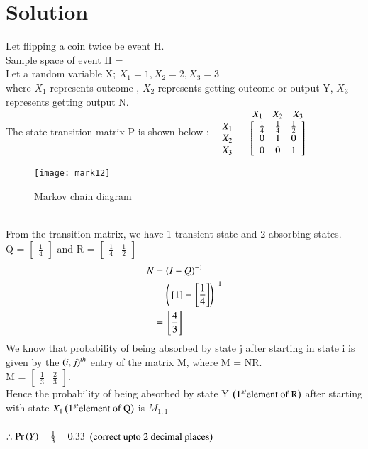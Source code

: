 \documentclass[journal,12pt,twocolumn]{IEEEtran}
\begin{document}
\section*{Solution}
Let flipping a coin twice be event H.\\
Sample space of event H = \\
Let a random variable X; $X_{1}=1, X_{2}=2, X_{3}=3$ \\
where $X_{1}$ represents outcome , $X_{2}$ represents getting outcome  or output Y, $X_{3}$ represents getting output N.\\
The state transition matrix P is shown below :
$\begin{array}{c c} &
\begin{array}{c c c} X_{1}  & X_{2} & X_{3} \\
\end{array}
\\
\begin{array}{c c c}
X_{1} \\
X_{2}\\
X_{3}
\end{array}
&
\left[
\begin{array}{c c c}
\frac{1}{4} & \frac{1}{4} & \frac{1}{2} \\
0 & 1 & 0 \\
0 & 0 & 1 
\end{array}
\right]
\end{array}$
\\
\begin{figure}[h]
\caption*{Markov chain diagram}
\centering
\texttt{[image: mark12]}\\
\end{figure}\\
From the transition matrix, we have 1 transient state and 2 absorbing states.\\ Q = $\begin{bmatrix} \frac{1}{4} \end{bmatrix}$ and R = $\begin{bmatrix} \frac{1}{4} & \frac{1}{2} \end{bmatrix}$
\begin{equation*}
\begin{split}
 N &= \left(I - Q\right)^{-1}\\
 &= \left({}\left[1\right] - {}\left[\frac{1}{4}\right]\right)^{-1}\\
 &= {}\left[\frac{4}{3}\right]
\end{split}
\end{equation*}
We know that probability of being absorbed by state j after starting in state i is given by the $\left(i,j\right)^{th}$ entry of the matrix M, where M = NR.\\
M = $\begin{bmatrix} \frac{1}{3} & \frac{2}{3} \end{bmatrix}$.\\
 Hence the probability of being absorbed by state Y $\left(1^{st} \text{element of R}\right)$ after starting with state $X_{1}\left(1^{st}\text{element of Q}\right)$ is $M_{1,1}$\\
 \\
$\therefore \Pr\left(Y\right)=\frac{1}{3}=0.33$ $\left(\text{correct upto 2 decimal places}\right)$
\end{document}
